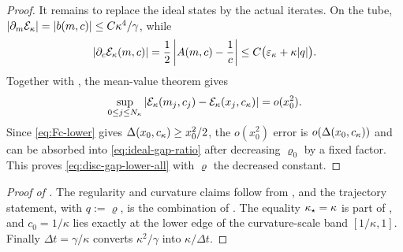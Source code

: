 \begin{proof}
    It remains to replace the ideal states by the actual iterates. On the tube,
    $|\partial_m\mathcal{E}_\kappa|=|b(m,c)|\leq C\kappa^4/\gamma$, while
    \begin{equation*}
        \left|\partial_c\mathcal{E}_\kappa(m,c)\right|
        =\frac12\left|A(m,c)-\frac1c\right|
        \leq C\bigl(\varepsilon_\kappa+\kappa|q|\bigr).
    \end{equation*}
    Together with , the mean-value theorem gives
    \begin{equation}\label{eq:objective-shadow}
        \sup_{0\leq j\leq N_\kappa}
        \left|\mathcal{E}_\kappa(m_j,c_j)-\mathcal{E}_\kappa(x_j,c_\kappa)\right|=o(x_0^2).
    \end{equation}
    Since \eqref{eq:Fc-lower} gives $\Delta(x_0,c_\kappa)\geq x_0^2/2$, the $o(x_0^2)$ error is
    $o(\Delta(x_0,c_\kappa))$ and can be absorbed into \eqref{eq:ideal-gap-ratio} after
    decreasing $\varrho_0$ by a fixed factor. This proves \eqref{eq:disc-gap-lower-all} with
    $\varrho$ the decreased constant.
\end{proof}

\begin{proof}[Proof of ]
    The regularity and curvature claims follow from , and the
    trajectory statement, with $q:=\varrho$, is the combination of
    . The equality $\kappa_\star=\kappa$ is part of
    , and $c_0=1/\kappa$ lies exactly at the lower edge of the
    curvature-scale band $[1/\kappa,1]$. Finally $\Delta t=\gamma/\kappa$ converts
    $\kappa^2/\gamma$ into $\kappa/\Delta t$.
\end{proof}

